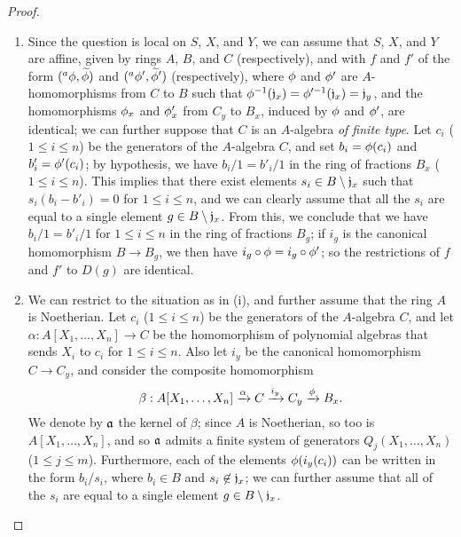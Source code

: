 \begin{proof}
\label{proof-1.6.5.1}
\medskip\noindent
\begin{enumerate}[label=(\roman*)]
    \item Since the question is local on $S$, $X$, and $Y$, we can assume that $S$, $X$, and $Y$ are affine, given by rings $A$, $B$, and $C$ (respectively), and with $f$ and $f'$ of the form $({}^a\phi,\widetilde{\phi})$ and $({}^a\phi',\widetilde{\phi}')$ (respectively), where $\phi$ and $\phi'$ are $A$-homomorphisms from $C$ to $B$ such that $\phi^{-1}(\mathfrak{j}_x)=\phi'^{-1}(\mathfrak{j}_x)=\mathfrak{j}_y$, and the homomorphisms $\phi_x$ and $\phi'_x$ from $C_y$ to $B_x$, induced by $\phi$ and $\phi'$, are identical;
        we can further suppose that $C$ is an $A$-algebra \emph{of finite type}.
        Let $c_i$ ($1\leqslant i\leqslant n$) be the generators of the $A$-algebra $C$, and set $b_i=\phi(c_i)$ and $b'_i=\phi'(c_i)$;
        by hypothesis, we have $b_i/1=b'_i/1$ in the ring of fractions $B_x$ ($1\leqslant i\leqslant n$).
        This implies that there exist elements $s_i\in B\setminus\mathfrak{j}_x$ such that $s_i(b_i-b'_i)=0$ for $1\leqslant i\leqslant n$, and we can clearly assume that all the $s_i$ are equal to a single element $g\in B\setminus\mathfrak{j}_x$.
        From this, we conclude that we have $b_i/1=b'_i/1$ for $1\leqslant i\leqslant n$ in the ring of fractions $B_g$;
        if $i_g$ is the canonical homomorphism $B\to B_g$, we then have $i_g\circ\phi=i_g\circ\phi'$;
        so the restrictions of $f$ and $f'$ to $D(g)$ are identical.
    \item We can restrict to the situation as in (i), and further assume that the ring $A$ is Noetherian.
        Let $c_i$ ($1\leqslant i\leqslant n$) be the generators of the $A$-algebra $C$, and let $\alpha:A[X_1,\ldots,X_n]\to C$ be the homomorphism of polynomial algebras that sends $X_i$ to $c_i$ for $1\leqslant i\leqslant n$.
        Also let $i_y$ be the canonical homomorphism $C\to C_y$, and consider the composite homomorphism
        \[
            \beta:A[X_1,\ldots,X_n] \xrightarrow{\alpha} C \xrightarrow{i_y} C_y \xrightarrow{\phi} B_x.
        \]
        We denote by $\mathfrak{a}$ the kernel of $\beta$;
        since $A$ is Noetherian, so too is $A[X_1,\ldots,X_n]$, and so $\mathfrak{a}$ admits a finite system of generators $Q_j(X_1,\ldots,X_n)$ ($1\leqslant j\leqslant m$).
        Furthermore, each of the elements $\phi(i_y(c_i))$ can be written in the form $b_i/s_i$, where $b_i\in B$ and $s_i\not\in\mathfrak{j}_x$;
        we can further assume that all of the $s_i$ are equal to a single element $g\in B\setminus\mathfrak{j}_x$.

\end{enumerate}
\end{proof}
